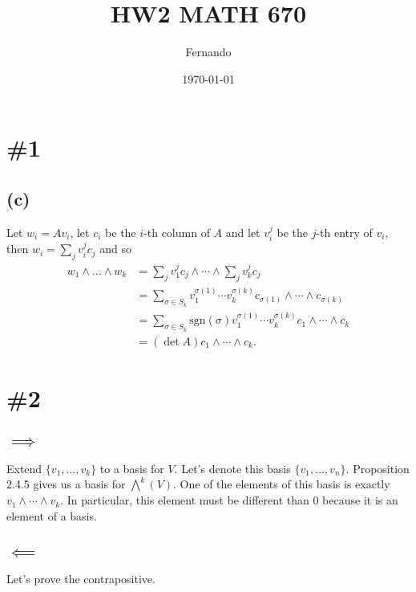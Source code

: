 \documentclass{article}
\begin{document}
\newcommand{\R}{\mathbb{R}}

\title{HW2 MATH 670}
\author{Fernando}
\date{\today}
\maketitle

\section*{\#1}
\subsection*{(c)}
Let $w_i=Av_i$, let $c_i$ be the $i$-th column of $A$ and let $v_i^j$ be the
$j$-th entry of $v_i$, then $w_i=\sum_j v_i^jc_j$ and so
\begin{align*}
	w_1\wedge\dots\wedge w_k&=\sum_j v_1^jc_j\wedge\cdots\wedge\sum_j v_k^jc_j\\
				&=\sum_{\sigma\in S_k}v_1^{\sigma(1)}\cdots v_k^{\sigma(k)}c_{\sigma(1)}\wedge\cdots\wedge c_{\sigma(k)}\\
				&=\sum_{\sigma\in S_k}\text{sgn}(\sigma)v_1^{\sigma(1)}\cdots v_k^{\sigma(k)}c_1\wedge\cdots\wedge c_k\\
				&=(\det A)c_1\wedge\cdots\wedge c_k.
\end{align*}
\section*{\#2}
\subsection*{$\implies$}

Extend $\{v_1,\dots,v_k\}$ to a basis for $V$. Let's denote this basis
$\{v_1,\dots,v_n\}$. Proposition 2.4.5 gives us a basis for $\bigwedge^k(V)$.
One of the elements of this basis is exactly $v_1\wedge \cdots\wedge v_k$. In
particular, this element must be different than 0 because it is an element of a
basis.

\subsection*{$\impliedby$}
Let's prove the contrapositive.
\end{document}
